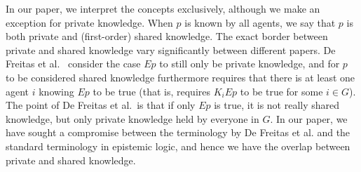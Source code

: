 \documentclass[a4paper,superscriptaddress,nofootinbib]{revtex4}
\begin{document}
In our paper, we interpret the concepts exclusively, although we make an exception for private knowledge. When $p$ is known by all agents, we say that $p$ is both private and (first-order) shared knowledge. The exact border between private and shared knowledge vary significantly between different papers. De Freitas et al.~\cite{de2019common} consider the case $E p$ to still only be private knowledge, and for $p$ to be considered shared knowledge furthermore requires that there is at least one agent $i$ knowing $E p$ to be true (that is, requires $K_i E p$ to be true for some $i \in G$). The point of De Freitas et al.\ is that if only $E p$ is true, it is not really shared knowledge, but only private knowledge held by everyone in $G$. In our paper, we have sought a compromise between the terminology by De Freitas et al. and the standard terminology in epistemic logic, and hence we have the overlap between private and shared knowledge.
\end{document}
